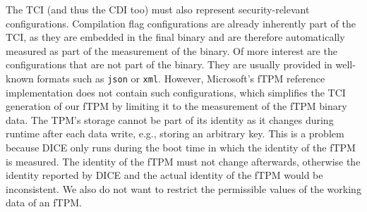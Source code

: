 The TCI (and thus the CDI too) must also represent security-relevant configurations.
Compilation flag configurations are already inherently part of the TCI, as they are embedded in the final binary and are therefore automatically measured as part of the measurement of the binary.
Of more interest are the configurations that are not part of the binary.
They are usually provided in well-known formats such as \texttt{json} or \texttt{xml}.
However, Microsoft's fTPM reference implementation does not contain such configurations, which simplifies the TCI generation of our fTPM by limiting it to the measurement of the fTPM binary data.
The TPM's storage cannot be part of its identity as it changes during runtime after each data write, e.g., storing an arbitrary key.
This is a problem because DICE only runs during the boot time in which the identity of the fTPM is measured.
The identity of the fTPM must not change afterwards, otherwise the identity reported by DICE and the actual identity of the fTPM would be inconsistent.
We also do not want to restrict the permissible values of the working data of an fTPM\@.


